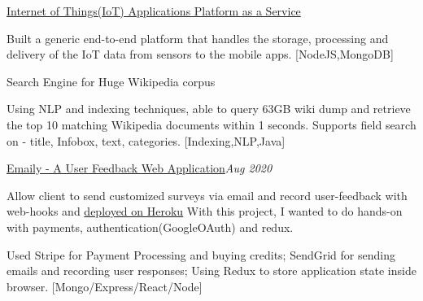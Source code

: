 \documentclass{resume}
\begin{document}
\begin{rSection}{}
\begin{rSubsection}{\href{https://github.com/somename058/IAS_DataListener}{Internet of Things(IoT) Applications Platform as a Service}}{}{}{} 
\item Built a generic end-to-end platform that handles the storage, processing and delivery of the IoT data from sensors to the mobile apps.
 [NodeJS,MongoDB]
 \end{rSubsection} 

\begin{rSubsection}{Search Engine for Huge Wikipedia corpus}{}{}{}
\item Using NLP and indexing techniques, able to query 63GB wiki dump and retrieve the top 10 matching Wikipedia documents within 1 seconds. Supports field search on - title, Infobox, text, categories. [Indexing,NLP,Java]
\end{rSubsection}


\begin{rSubsection}{\href{https://github.com/praveen-yadav/express_with_react}{Emaily - A User Feedback Web Application}}{\emph{Aug 2020 }}{}{}
\item 
Allow client to send customized surveys via email and record user-feedback with web-hooks and {\href{https://powerful-caverns-04805.herokuapp.com/r}{deployed on Heroku}}
With this project, I wanted to do hands-on with payments, authentication(GoogleOAuth) and redux.

Used Stripe for Payment Processing and buying credits; 
SendGrid for sending emails and recording user responses;
Using Redux to store application state inside browser.  [Mongo/Express/React/Node]
\end{rSubsection}


\iffalse
\begin{rSubsection}{Index real-time Twitter stream }{\emph{2019 }}{}{}
\item Insert real-time tweets into Kafka-topic. Consumers take data from Kafka and put it in Elastic-Search for indexing. [Distributed system, Apache Kafka]
\end{rSubsection}
\fi

\end{rSection} 
\end{document}
